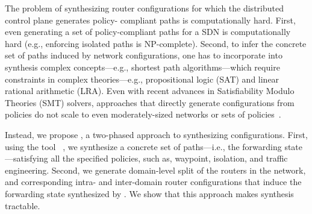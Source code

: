 

The problem of synthesizing router configurations
for which the distributed control plane  
generates policy- compliant paths 
is computationally hard. 
First, even generating a set of policy-compliant 
paths for a SDN  is 
computationally hard (e.g., enforcing isolated
paths is NP-complete). 
Second, to infer the concrete
set of paths induced by network configurations, 
one has to incorporate
into synthesis
complex concepts---e.g., shortest path algorithms---which
require constraints in complex
theories---e.g., propositional logic (SAT) 
and linear rational
arithmetic (LRA). Even with recent 
advances in Satisfiability Modulo Theories
(SMT) solvers, 
approaches that directly generate configurations  from policies
do not scale to
even moderately-sized networks or 
sets of policies~\cite{synet}.


Instead, we propose \name, a two-phased approach to synthesizing
configurations.  First, using the tool \genesis~\cite{genesis}, we synthesize a
concrete set of paths---i.e., the forwarding state---satisfying all
the specified policies, such as, waypoint, isolation,
and traffic engineering.
Second, we generate
domain-level split of the routers in the network,
and corresponding 
intra- and inter-domain router configurations
that induce the forwarding
state synthesized by \genesis. We show that this approach makes synthesis tractable.


